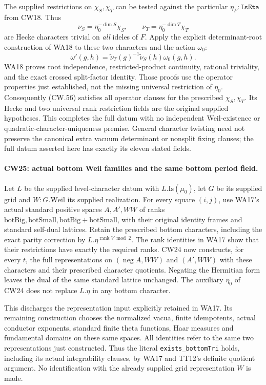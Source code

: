 The supplied restrictions on $\chi_S,\chi_T$ can be tested
against the particular $\eta_F:\texttt{IsEta}$ from CW18.
Thus
\[
       \nu_S=\eta_0^{-\dim S}\chi_S,\qquad
       \nu_T=\eta_0^{-\dim T}\chi_T
\]
are Hecke characters trivial on \emph{all} ideles of $F$.
Apply the explicit determinant-root construction of WA18 to
these two characters and the action $\omega_0$:
\[
 \omega'(g,h)=\widetilde\nu_T(g)^{-1}
                            \widetilde\nu_S(h)\omega_0(g,h).
                                                               \tag{CW.56}
\]
WA18 proves root independence, restricted-product continuity,
rational triviality, and the exact crossed split-factor identity.
Those proofs use the operator properties just established, not
the missing universal restriction of $\eta_0$.
Consequently (CW.56) satisfies all operator clauses for the
prescribed $\chi_S,\chi_T$.  Its Hecke and two universal rank
restriction fields are the original supplied hypotheses.
This completes the full datum with no independent Weil-existence
or quadratic-character-uniqueness premise.  General character
twisting need not preserve the canonical extra vacuum determinant
or nonsplit fixing clauses; the full datum asserted here has
exactly its eleven stated fields.

\paragraph{CW25: actual bottom Weil families and the same bottom period field.}
Let $L$ be the supplied level-character datum with $L.\mathrm{Is}(\mu_0)$,
let $G$ be its supplied grid and $W:G.\mathrm{Weil}$ its supplied
realization.  For every square $(i,j)$, use WA17's actual standard
positive spaces $A,A',WW$ of ranks
$\mathrm{botBig},\mathrm{botSmall},\mathrm{botBig}+\mathrm{botSmall}$,
with their original identity frames and standard self-dual lattices.
Retain the prescribed bottom characters, including the exact
parity correction by $L.\eta^{\operatorname{rank}V\bmod2}$.
The rank identities in WA17 show that their restrictions have
exactly the required ranks.  CW24 now constructs, for every $t$,
the full representations on $(\operatorname{neg}A,WW)$ and
$(A',WW)$ with these characters and their prescribed character
quotients.  Negating the Hermitian form leaves the dual of the
same standard lattice unchanged.  The auxiliary $\eta_0$ of
CW24 does not replace $L.\eta$ in any bottom character.

This discharges the representation input explicitly retained in
WA17.  Its remaining construction chooses the normalized vacua,
finite idempotents, actual conductor exponents, standard finite
theta functions, Haar measures and fundamental domains on these
same spaces.  All identities refer to the same two
representations just constructed.  Thus the literal
\texttt{exists\_bottomTri} holds, including its actual
integrability clauses, by WA17 and TT12's definite quotient
argument.  No identification with the already supplied grid
representation $W$ is made.

